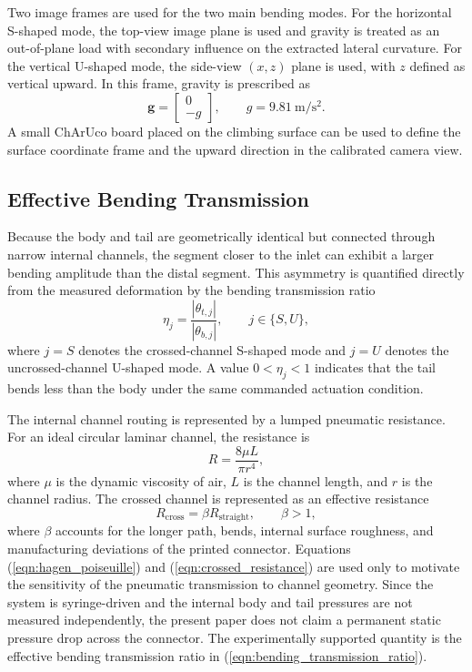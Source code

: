 Two image frames are used for the two main bending modes. For the horizontal S-shaped mode, the top-view image plane is used and gravity is treated as an out-of-plane load with secondary influence on the extracted lateral curvature. For the vertical U-shaped mode, the side-view $(x,z)$ plane is used, with $z$ defined as vertical upward. In this frame, gravity is prescribed as
\begin{equation}
  \mathbf{g} =
  \begin{bmatrix}
    0 \\
    -g
  \end{bmatrix},
  \qquad g = 9.81~\mathrm{m/s^2}.
  \label{eqn:gravity_vector}
\end{equation}
A small ChArUco board placed on the climbing surface can be used to define the surface coordinate frame and the upward direction in the calibrated camera view.

\subsection{Effective Bending Transmission}

Because the body and tail are geometrically identical but connected through narrow internal channels, the segment closer to the inlet can exhibit a larger bending amplitude than the distal segment. This asymmetry is quantified directly from the measured deformation by the bending transmission ratio
\begin{equation}
  \eta_j =
  \frac{|\theta_{t,j}|}{|\theta_{b,j}|},
  \qquad
  j \in \{S,U\},
  \label{eqn:bending_transmission_ratio}
\end{equation}
where $j=S$ denotes the crossed-channel S-shaped mode and $j=U$ denotes the uncrossed-channel U-shaped mode. A value $0 < \eta_j < 1$ indicates that the tail bends less than the body under the same commanded actuation condition.

The internal channel routing is represented by a lumped pneumatic resistance. For an ideal circular laminar channel, the resistance is
\begin{equation}
  R = \frac{8 \mu L}{\pi r^4},
  \label{eqn:hagen_poiseuille}
\end{equation}
where $\mu$ is the dynamic viscosity of air, $L$ is the channel length, and $r$ is the channel radius. The crossed channel is represented as an effective resistance
\begin{equation}
  R_{\mathrm{cross}} = \beta R_{\mathrm{straight}}, \qquad \beta > 1,
  \label{eqn:crossed_resistance}
\end{equation}
where $\beta$ accounts for the longer path, bends, internal surface roughness, and manufacturing deviations of the printed connector. Equations (\ref{eqn:hagen_poiseuille}) and (\ref{eqn:crossed_resistance}) are used only to motivate the sensitivity of the pneumatic transmission to channel geometry. Since the system is syringe-driven and the internal body and tail pressures are not measured independently, the present paper does not claim a permanent static pressure drop across the connector. The experimentally supported quantity is the effective bending transmission ratio in (\ref{eqn:bending_transmission_ratio}).

